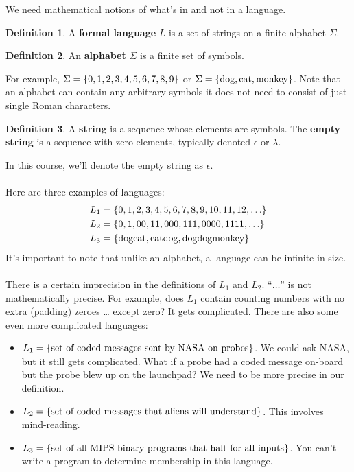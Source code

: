 \documentclass[]{article}
\DeclarePairedDelimiter{\set}{\lbrace}{\rbrace}
\theoremstyle{definition}
\newtheorem*{defn}{Definition}
\newcommand{\lecture}[1]{\marginpar{{\footnotesize $\leftarrow$ \underline{#1}}}}
\begin{document}
		\lecture{February 4, 2013}
		We need mathematical notions of what's in and not in a language.

		\begin{defn}
		A \textbf{formal language} $L$ is a set of strings on a finite alphabet $\Sigma$.
		\end{defn}

		\begin{defn}
			An \textbf{alphabet} $\Sigma$ is a finite set of symbols.
		\end{defn}
		For example, $\Sigma = \set{0, 1, 2, 3, 4, 5, 6, 7, 8, 9}$ or $\Sigma = \set{\text{dog}, \text{cat}, \text{monkey}}$. Note that an alphabet can contain any arbitrary symbols \textendash{} it does not need to consist of just single Roman characters.

		\begin{defn}
			A \textbf{string} is a sequence whose elements are symbols. The \textbf{empty string} is a sequence with zero elements, typically denoted $\epsilon$ or $\lambda$.
		\end{defn}
		In this course, we'll denote the empty string as $\epsilon$.
		\\ \\
		Here are three examples of languages:
		\begin{align*}
			L_1 &= \set{0, 1, 2, 3, 4, 5, 6, 7, 8, 9, 10, 11, 12, \ldots} \\
			L_2 &= \set{0, 1, 00, 11, 000, 111, 0000, 1111, \ldots} \\
			L_3 &= \set{\text{dogcat}, \text{catdog}, \text{dogdogmonkey}}
		\end{align*}
		It's important to note that unlike an alphabet, a language can be infinite in size.
		\\ \\
		There is a certain imprecision in the definitions of $L_1$ and $L_2$. ``$\ldots$'' is not mathematically precise. For example, does $L_1$ contain counting numbers with no extra (padding) zeroes \ldots{} except zero? It gets complicated. There are also some even more complicated languages:
		\begin{itemize}
			\item $L_1 = \set{\text{set of coded messages sent by NASA on probes}}$. We could ask NASA, but it still gets complicated. What if a probe had a coded message on-board but the probe blew up on the launchpad? We need to be more precise in our definition.
			\item $L_2 = \set{\text{set of coded messages that aliens will understand}}$. This involves mind-reading.
			\item $L_3 = \set{\text{set of all MIPS binary programs that halt for all inputs}}$. You can't write a program to determine membership in this language.
		\end{itemize}
\end{document}
